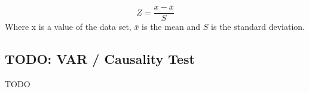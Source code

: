 \begin{equation}
    Z = \frac{x - \bar{x}}{S}
\end{equation}
Where x is a value of the data set, $\bar{x}$ is the mean and $S$ is the standard deviation.

\subsection{TODO: VAR / Causality Test}
TODO
